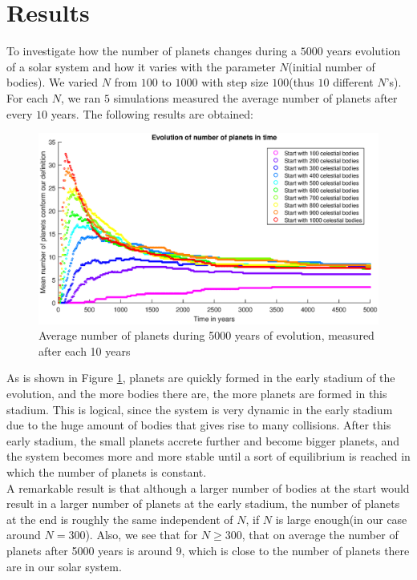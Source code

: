 \section{Results}
To investigate how the number of planets changes during a $5000$ years evolution of a solar system and how it varies with the parameter $N$(initial number of bodies). 
We varied $N$ from $100$ to $1000$ with step size $100$(thus $10$ different $N$'s). 
For each $N$, we ran $5$ simulations measured the average number of planets after every $10$ years. The following results are obtained:

\begin{figure}[H]
\centering
\includegraphics[scale=0.8]{APgrafiek.eps}
\caption{Average number of planets during 5000 years of evolution, measured after each 10 years}
    \label{fig:AantPlaneten}
\end{figure}

As is shown in Figure \ref{fig:AantPlaneten}, planets are quickly formed in the early stadium of the evolution, and the more bodies there are, the more planets are formed in this stadium. 
This is logical, since the system is very dynamic in the early stadium due to the huge amount of bodies that gives rise to many collisions. 
After this early stadium, the small planets accrete further and become bigger planets, and the system becomes more and more stable until a sort of equilibrium is reached in which the number of planets is constant.\\

A remarkable result is that although a larger number of bodies at the start would result in a larger number of planets at the early stadium, the number of planets at the end is roughly the same independent of $N$, if $N$ is large enough(in our case around $N=300$). Also, we see that for $N\geq 300$, that on average the number of planets after 5000 years is around 9, which is close to the number of planets there are in our solar system.\\

